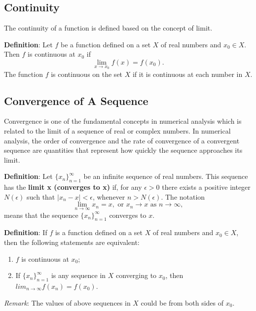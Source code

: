 \documentclass[
]{book}
\begin{document}
\hypertarget{continuity}{%
\subsection{Continuity}\label{continuity}}

The continuity of a function is defined based on the concept of limit.

\textbf{Definition}: Let \(f\) be a function defined on a set \(X\) of real numbers and \(x_0 \in X\). Then \(f\) is continuous
at \(x_0\) if
\[
\lim_{x\to x_0}f (x) = f (x_0).
\]
The function \(f\) is continuous on the set \(X\) if it is continuous at each number in \(X\).

\hypertarget{convergence-of-a-sequence}{%
\subsection{Convergence of A Sequence}\label{convergence-of-a-sequence}}

Convergence is one of the fundamental concepts in numerical analysis which is related to the limit of a sequence of real or complex numbers. In numerical analysis, the order of convergence and the rate of convergence of a convergent sequence are quantities that represent how quickly the sequence approaches its limit.

\textbf{Definition}: Let \(\{x_n\}^\infty_{n=1}\) be an infinite sequence of real numbers. This sequence has the \textbf{limit x (converges to x)} if, for any \(\epsilon > 0\) there exists a positive integer \(N(\epsilon)\) such that \(|x_n-x|<\epsilon\), whenever \(n > N(\epsilon)\). The notation
\[
\lim_{n \to\infty}x_n = x, \text{ or } x_n \to x \text{ as } n\to \infty,
\]
means that the sequence \(\{x_n\}^\infty_{n=1}\) converges to \(x\).

\textbf{Definition}: If \(f\) is a function defined on a set \(X\) of real numbers and \(x_0 \in X\), then the following statements are equivalent:

\begin{enumerate}
\def\labelenumi{\alph{enumi}.}
\item
  \(f\) is continuous at \(x_0\);
\item
  If \(\{x_n\}^\infty_{n=1}\) is any sequence in \(X\) converging to \(x_0\), then \(lim_{n\to \infty} f (x_n) = f (x_0)\).
\end{enumerate}

\emph{Remark}: The values of above sequences in \(X\) could be from both sides of \(x_0\).
\end{document}
